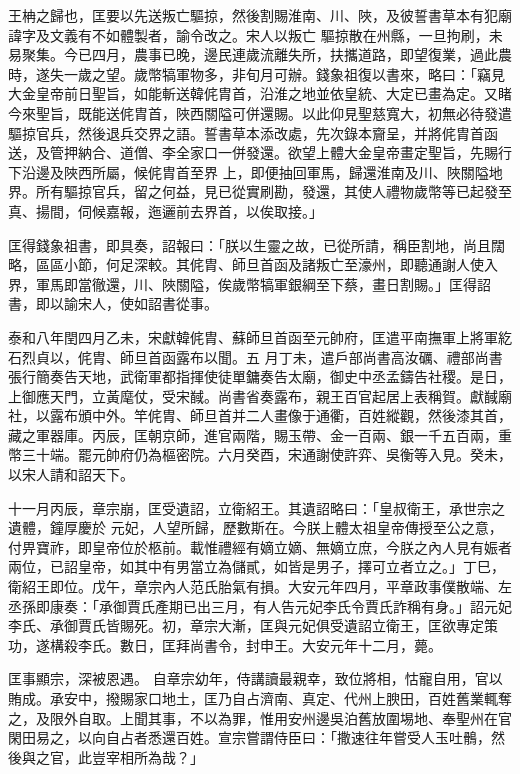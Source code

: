 \begin{pinyinscope}
 王柟之歸也，匡要以先送叛亡驅掠，然後割賜淮南、川、陜，及彼誓書草本有犯廟諱字及文義有不如體製者，諭令改之。宋人以叛亡
 驅掠散在州縣，一旦拘刷，未易聚集。今已四月，農事已晚，邊民連歲流離失所，扶攜道路，即望復業，過此農時，遂失一歲之望。歲幣犒軍物多，非旬月可辦。錢象祖復以書來，略曰：「竊見大金皇帝前日聖旨，如能斬送韓侂胄首，沿淮之地並依皇統、大定已畫為定。又睹今來聖旨，既能送侂胄首，陜西關隘可併還賜。以此仰見聖慈寬大，初無必待發遣驅掠官兵，然後退兵交界之語。誓書草本添改處，先次錄本齎呈，并將侂胄首函送，及管押納合、道僧、李全家口一併發還。欲望上體大金皇帝畫定聖旨，先賜行下沿邊及陜西所屬，候侂胄首至界
 上，即便抽回軍馬，歸還淮南及川、陜關隘地界。所有驅掠官兵，留之何益，見已從實刷勘，發還，其使人禮物歲幣等已起發至真、揚間，伺候嘉報，迤邐前去界首，以俟取接。」



 匡得錢象祖書，即具奏，詔報曰：「朕以生靈之故，已從所請，稱臣割地，尚且闊略，區區小節，何足深較。其侂胄、師旦首函及諸叛亡至濠州，即聽通謝人使入界，軍馬即當徹還，川、陜關隘，俟歲幣犒軍銀綱至下蔡，畫日割賜。」匡得詔書，即以諭宋人，使如詔書從事。



 泰和八年閏四月乙未，宋獻韓侂胄、蘇師旦首函至元帥府，匡遣平南撫軍上將軍紇石烈貞以，侂胄、師旦首函露布以聞。五
 月丁未，遣戶部尚書高汝礪、禮部尚書張行簡奏告天地，武衛軍都指揮使徒單鏞奏告太廟，御史中丞孟鑄告社稷。是日，上御應天門，立黃麾仗，受宋馘。尚書省奏露布，親王百官起居上表稱賀。獻馘廟社，以露布頒中外。竿侂胄、師旦首并二人畫像于通衢，百姓縱觀，然後漆其首，藏之軍器庫。丙辰，匡朝京師，進官兩階，賜玉帶、金一百兩、銀一千五百兩，重幣三十端。罷元帥府仍為樞密院。六月癸酉，宋通謝使許弈、吳衡等入見。癸未，以宋人請和詔天下。



 十一月丙辰，章宗崩，匡受遺詔，立衛紹王。其遺詔略曰：「皇叔衛王，承世宗之遺體，鐘厚慶於
 元妃，人望所歸，歷數斯在。今朕上體太祖皇帝傳授至公之意，付畀寶祚，即皇帝位於柩前。載惟禮經有嫡立嫡、無嫡立庶，今朕之內人見有娠者兩位，已詔皇帝，如其中有男當立為儲貳，如皆是男子，擇可立者立之。」丁巳，衛紹王即位。戊午，章宗內人范氏胎氣有損。大安元年四月，平章政事僕散端、左丞孫即康奏：「承御賈氏產期已出三月，有人告元妃李氏令賈氏詐稱有身。」詔元妃李氏、承御賈氏皆賜死。初，章宗大漸，匡與元妃俱受遺詔立衛王，匡欲專定策功，遂構殺李氏。數日，匡拜尚書令，封申王。大安元年十二月，薨。



 匡事顯宗，深被恩遇。
 自章宗幼年，侍講讀最親幸，致位將相，怙寵自用，官以賄成。承安中，撥賜家口地土，匡乃自占濟南、真定、代州上腴田，百姓舊業輒奪之，及限外自取。上聞其事，不以為罪，惟用安州邊吳泊舊放圍埸地、奉聖州在官閑田易之，以向自占者悉還百姓。宣宗嘗謂侍臣曰：「撒速往年嘗受人玉吐鶻，然後與之官，此豈宰相所為哉？」




\end{pinyinscope}
